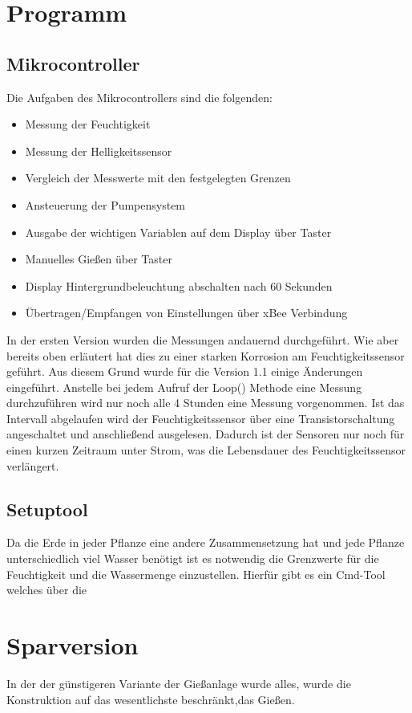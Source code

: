\documentclass[]{IEEEtran}
\begin{document}
\section{Programm}
	
	\subsection{Mikrocontroller}
	Die Aufgaben des Mikrocontrollers sind die folgenden:
		\begin{itemize}
			\item Messung der Feuchtigkeit
			\item Messung der Helligkeitssensor
			\item Vergleich der Messwerte mit den festgelegten Grenzen
			\item Ansteuerung der Pumpensystem
			\item Ausgabe der wichtigen Variablen auf dem Display über Taster
			\item Manuelles Gießen über Taster
			\item Display Hintergrundbeleuchtung abschalten nach 60  Sekunden
			\item Übertragen/Empfangen von Einstellungen über xBee Verbindung
		\end{itemize}
		
	In der ersten Version wurden die Messungen andauernd durchgeführt. Wie aber bereits oben erläutert hat dies zu einer starken Korrosion am Feuchtigkeitssensor geführt. Aus diesem Grund wurde für die Version 1.1 einige Änderungen eingeführt. Anstelle bei jedem Aufruf der Loop() Methode eine Messung durchzuführen wird nur noch alle 4 Stunden eine Messung vorgenommen. Ist das Intervall abgelaufen wird der Feuchtigkeitssensor über eine Transistorschaltung angeschaltet und anschließend ausgelesen. Dadurch ist der Sensoren nur noch für einen kurzen Zeitraum unter Strom, was die Lebensdauer des Feuchtigkeitssensor verlängert.
		
	
	\subsection{Setuptool}
	Da die Erde in jeder Pflanze eine andere Zusammensetzung hat und jede Pflanze unterschiedlich viel Wasser benötigt ist es notwendig die Grenzwerte für die Feuchtigkeit und die Wassermenge einzustellen. Hierfür gibt es ein Cmd-Tool welches über die 
	
			\section{Sparversion}
	In der der günstigeren Variante der Gießanlage wurde alles, wurde die Konstruktion auf das wesentlichste beschränkt,das Gießen.
\end{document}
